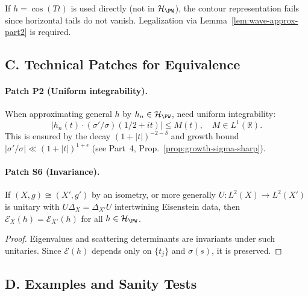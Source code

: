 \begin{counterexample}
If $h=\cos(Tt)$ is used directly (not in $\mathcal H_{\PW}$), the contour representation fails since horizontal tails do not vanish. Legalization via Lemma~\ref{lem:wave-approx-part2} is required.
\end{counterexample}


\subsection*{C. Technical Patches for Equivalence}
\label{subsec:patches-part3}

\paragraph{Patch P2 (Uniform integrability).}
When approximating general $h$ by $h_n\in\mathcal H_{\PW}$, need uniform integrability:
\[
  |h_n(t)\cdot(\sigma'/\sigma)(1/2+it)| \leq M(t),\quad M\in L^1(\mathbb R).
\]
This is ensured by the decay $(1+|t|)^{-2-\delta}$ and growth bound $|\sigma'/\sigma|\ll (1+|t|)^{1+\epsilon}$ (see Part~4, Prop.~\ref{prop:growth-sigma-sharp}).

\paragraph{Patch S6 (Invariance).}
\begin{proposition}
\label{prop:isometry-invariance-part3}
If $(X,g)\cong(X',g')$ by an isometry, or more generally $U:L^2(X)\to L^2(X')$ is unitary with $U\Delta_X=\Delta_{X'}U$ intertwining Eisenstein data, then $\mathcal E_X(h)=\mathcal E_{X'}(h)$ for all $h\in\mathcal H_{\PW}$.
\end{proposition}

\begin{proof}
Eigenvalues and scattering determinants are invariants under such unitaries. Since $\mathcal E(h)$ depends only on $\{t_j\}$ and $\sigma(s)$, it is preserved.
\end{proof}


\subsection*{D. Examples and Sanity Tests}
\label{subsec:examples-part3}

